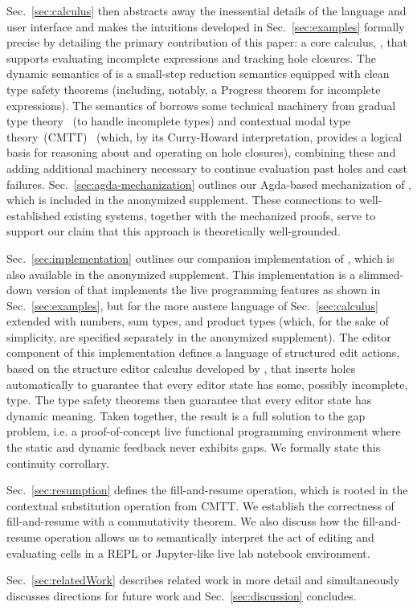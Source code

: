 Sec.~\ref{sec:calculus} then abstracts away the inessential details of the language and user interface and makes the  intuitions developed in Sec.~\ref{sec:examples} formally precise by detailing the primary contribution of this paper: a core calculus, \HazelnutLive, that supports evaluating incomplete expressions and tracking hole closures. The dynamic semantics of \HazelnutLive is a small-step reduction semantics equipped with clean type safety theorems (including, notably, a Progress theorem for incomplete expressions). The semantics of \HazelnutLive borrows some technical machinery from gradual type theory~\cite{DBLP:conf/snapl/SiekVCB15}
(to handle incomplete types) and contextual modal type theory~(CMTT)~\cite{Nanevski2008} (which, by its Curry-Howard interpretation, provides a logical basis for reasoning about and operating on hole closures), combining these and adding additional machinery necessary to continue evaluation past holes and cast failures.  
Sec.~\ref{sec:agda-mechanization} outlines our Agda-based mechanization of \HazelnutLive, which is included in the anonymized supplement.  
These connections to well-established existing systems, together with the mechanized proofs, serve to support our claim that this approach is theoretically well-grounded.

Sec.~\ref{sec:implementation} outlines our companion implementation of \HazelnutLive, which is also available in the anonymized supplement. This implementation is a slimmed-down version of \Hazel that implements the live programming features as shown in Sec.~\ref{sec:examples}, 
but for the more austere language of Sec.~\ref{sec:calculus} extended with numbers, sum types, and product types (which, for the sake of simplicity, are specified separately in the anonymized supplement). 
The editor component of this implementation defines a language of structured edit actions, 
based on the \Hazelnut structure editor calculus developed by \citet{popl-paper}, that inserts holes automatically to guarantee that
every editor state has some, possibly incomplete, type. 
The type safety theorems then guarantee that every editor state has dynamic meaning. Taken together, the result is a full solution to the gap problem, i.e. a proof-of-concept
live functional programming environment where the static and dynamic feedback never exhibits gaps. We formally state this continuity corrollary.

Sec.~\ref{sec:resumption} defines the fill-and-resume operation, which is rooted in the contextual substitution operation from CMTT. We establish the correctness of fill-and-resume with a commutativity theorem. We also discuss how the fill-and-resume operation allows us to semantically interpret the act of editing and evaluating cells in a REPL or Jupyter-like live lab notebook environment.

Sec.~\ref{sec:relatedWork} describes related work in more detail and simultaneously discusses directions for future work and Sec.~\ref{sec:discussion} concludes. 

